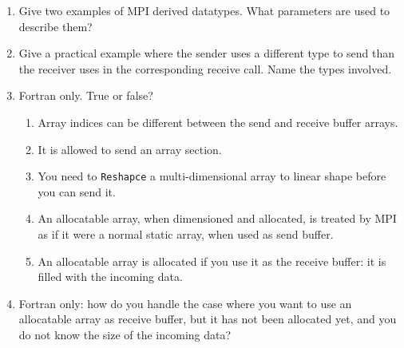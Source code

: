\begin{enumerate}
\item Give two examples of MPI derived datatypes. What parameters are used
to describe them?

\item Give a practical example where the sender uses a different type to send
  than the receiver uses in the corresponding receive call. Name the types involved.

\item Fortran only. True or false?
  \begin{enumerate}
  \item Array indices can be different between the send and receive buffer arrays.
  \item It is allowed to send an array section.
  \item You need to \lstinline{Reshapce} a multi-dimensional array
    to linear shape before you can send it.
  \item An allocatable array, when dimensioned and allocated, is
    treated by MPI as if it were a normal static array, when used as
    send buffer.
  \item An allocatable array is allocated if you use it as the receive
    buffer: it is filled with the incoming data.
  \end{enumerate}
\item Fortran only: how do you handle the case where you want to use
  an allocatable array as receive buffer, but it has not been
  allocated yet, and you do not know the size of the incoming data?

\end{enumerate}

